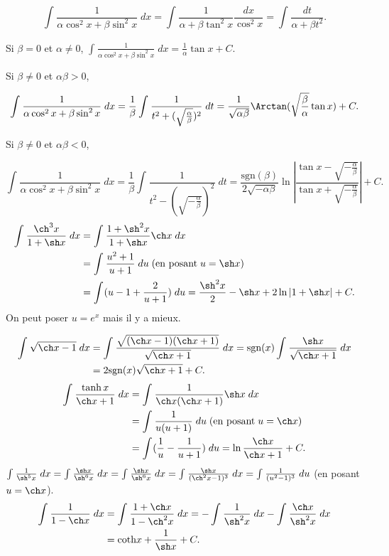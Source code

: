{{$$\int_{}^{}\frac{1}{\alpha\cos^2x+\beta\sin^2 x}\;dx=\int_{}^{}\frac{1}{\alpha+\beta\tan^2x}\frac{dx}{\cos^2x}=\int_{}^{}\frac{dt}{\alpha+\beta t^2}.$$

Si $\beta=0$ et $\alpha\neq0$, $\int_{}^{}\frac{1}{\alpha\cos^2x+\beta\sin^2x}\;dx=\frac{1}{\alpha}\tan x+C$.

Si $\beta\neq0$ et $\alpha\beta>0$, 

$$\int_{}^{}\frac{1}{\alpha\cos^2x+\beta\sin^2 x}\;dx=\frac{1}{\beta}\int_{}^{}\frac{1}{t^2+(\sqrt{\frac{\alpha}{\beta}})^2}\;dt=\frac{1}{\sqrt{\alpha\beta}}\Arctan(\sqrt{\frac{\beta}{\alpha}}\tan x)+C.$$

Si $\beta\neq0$ et $\alpha\beta<0$, 

$$\int_{}^{}\frac{1}{\alpha\cos^2x+\beta\sin^2 x}\;dx=\frac{1}{\beta}\int_{}^{}\frac{1}{t^2-(\sqrt{-\frac{\alpha}{\beta}})^2}\;dt=\frac{\mbox{sgn}(\beta)}
{2\sqrt{-\alpha\beta}}\ln\left|\frac{\tan x-\sqrt{-\frac{\alpha}{\beta}}}{\tan x+\sqrt{-\frac{\alpha}{\beta}}}\right|+C.$$
\begin{align*}\ensuremath
\int_{}^{}\frac{\ch^3x}{1+\sh x}\;dx&=\int_{}^{}\frac{1+\sh^2x}{1+\sh x}\ch x\;dx\\
 &=\int_{}^{}\frac{u^2+1}{u+1}\;du\;(\mbox{en posant}\;u=\sh x)\\
 &=\int_{}^{}(u-1+\frac{2}{u+1})\;du=\frac{\sh^2x}{2}-\sh x+2\ln|1+\sh x|+C.
\end{align*}
On peut poser $u=e^x$ mais il y a mieux.

\begin{align*}\ensuremath
\int_{}^{}\sqrt{\ch x-1}\;dx&=\int_{}^{}\frac{\sqrt{(\ch x-1)(\ch x+1)}}{\sqrt{\ch x+1}}\;dx=\mbox{sgn}(x)\int_{}^{}\frac{\sh x}{\sqrt{\ch x+1}}\;dx\\
 &=2\mbox{sgn}(x)\sqrt{\ch x+1}+C.
\end{align*}
\begin{align*}\ensuremath
\int_{}^{}\frac{\tanh x}{\ch x+1}\;dx&=\int_{}^{}\frac{1}{\ch x(\ch x+1)}\sh x\;dx\\
 &=\int_{}^{}\frac{1}{u(u+1)}\;du\;(\mbox{en posant}\;u=\ch x)\\
 &=\int_{}^{}(\frac{1}{u}-\frac{1}{u+1})\;du=\ln\frac{\ch x}{\ch x+1}+C.
\end{align*}
$\int_{}^{}\frac{1}{\sh^5x}\;dx=\int_{}^{}\frac{\sh x}{\sh^6x}\;dx
=\int_{}^{}\frac{\sh x}{\sh^6x}\;dx=\int_{}^{}\frac{\sh x}{(\ch^2x-1)^3}\;dx=\int_{}^{}\frac{1}{(u^2-1)^3}\;du$ (en posant $u=\ch x$).
\begin{align*}\ensuremath
\int_{}^{}\frac{1}{1-\ch x}\;dx&=\int_{}^{}\frac{1+\ch x}{1-\ch^2x}\;dx=-\int_{}^{}\frac{1}{\sh^2x}\;dx-\int_{}^{}\frac{\ch x}{\sh^2x}\;dx\\
 &=\mbox{coth}x+\frac{1}{\sh x}+C.
\end{align*}
}
}

